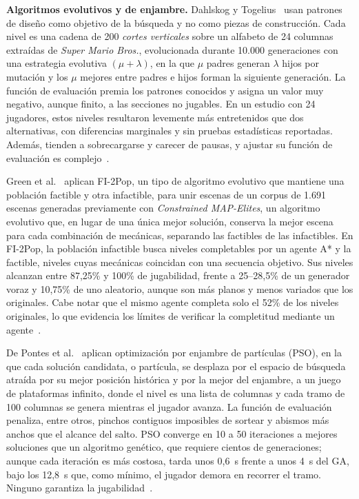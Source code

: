 \documentclass[letter, 10pt]{article}
\begin{document}
\textbf{Algoritmos evolutivos y de enjambre.} Dahlskog y Togelius~\cite{Dahlskog2013} usan patrones de dise\~no como objetivo de la b\'usqueda y no como piezas de construcci\'on. Cada nivel es una cadena de 200 \emph{cortes verticales} sobre un alfabeto de 24 columnas extra\'idas de \emph{Super Mario Bros.}, evolucionada durante 10.000 generaciones con una estrategia evolutiva $(\mu+\lambda)$, en la que $\mu$ padres generan $\lambda$ hijos por mutaci\'on y los $\mu$ mejores entre padres e hijos forman la siguiente generaci\'on. La funci\'on de evaluaci\'on premia los patrones conocidos y asigna un valor muy negativo, aunque finito, a las secciones no jugables. En un estudio con 24 jugadores, estos niveles resultaron levemente m\'as entretenidos que dos alternativas, con diferencias marginales y sin pruebas estad\'isticas reportadas. Adem\'as, tienden a sobrecargarse y carecer de pausas, y ajustar su funci\'on de evaluaci\'on es complejo~\cite{Dahlskog2013}.

Green et al.~\cite{Green2020} aplican FI-2Pop, un tipo de algoritmo evolutivo que mantiene una poblaci\'on factible y otra infactible, para unir escenas de un corpus de 1.691 escenas generadas previamente con \emph{Constrained MAP-Elites}, un algoritmo evolutivo que, en lugar de una \'unica mejor soluci\'on, conserva la mejor escena para cada combinaci\'on de mec\'anicas, separando las factibles de las infactibles. En FI-2Pop, la poblaci\'on infactible busca niveles completables por un agente A* y la factible, niveles cuyas mec\'anicas coincidan con una secuencia objetivo. Sus niveles alcanzan entre 87,25\% y 100\% de jugabilidad, frente a 25--28,5\% de un generador voraz y 10,75\% de uno aleatorio, aunque son m\'as planos y menos variados que los originales. Cabe notar que el mismo agente completa solo el 52\% de los niveles originales, lo que evidencia los l\'imites de verificar la completitud mediante un agente~\cite{Green2020}.

De Pontes et al.~\cite{DePontes2022} aplican optimizaci\'on por enjambre de part\'iculas (PSO), en la que cada soluci\'on candidata, o part\'icula, se desplaza por el espacio de b\'usqueda atra\'ida por su mejor posici\'on hist\'orica y por la mejor del enjambre, a un juego de plataformas infinito, donde el nivel es una lista de columnas y cada tramo de 100 columnas se genera mientras el jugador avanza. La funci\'on de evaluaci\'on penaliza, entre otros, pinchos contiguos imposibles de sortear y abismos m\'as anchos que el alcance del salto. PSO converge en 10 a 50 iteraciones a mejores soluciones que un algoritmo gen\'etico, que requiere cientos de generaciones; aunque cada iteraci\'on es m\'as costosa, tarda unos 0,6~s frente a unos 4~s del GA, bajo los 12,8~s que, como m\'inimo, el jugador demora en recorrer el tramo. Ninguno garantiza la jugabilidad~\cite{DePontes2022}.
\end{document}
